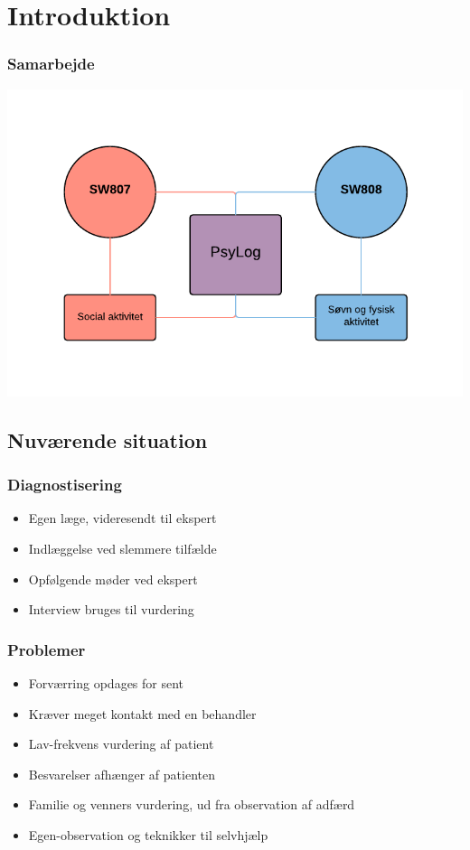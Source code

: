\section{Introduktion}

\begin{frame}
\frametitle{Samarbejde}

\includegraphics[width=\textwidth]{graphics/samarbejde.pdf}

\end{frame}

\subsection{Nuværende situation}

\begin{frame}
\frametitle{Diagnostisering}

\begin{itemize}
\item Egen læge, videresendt til ekspert
\item Indlæggelse ved slemmere tilfælde
\item Opfølgende møder ved ekspert
\item Interview bruges til vurdering
\end{itemize}

\end{frame}

\begin{frame}
\frametitle{Problemer}
\begin{itemize}
\item Forværring opdages for sent
\item Kræver meget kontakt med en behandler
\item Lav-frekvens vurdering af patient
\item Besvarelser afhænger af patienten
\item Familie og venners vurdering, ud fra observation af adfærd
\item Egen-observation og teknikker til selvhjælp
\end{itemize}

\end{frame}


